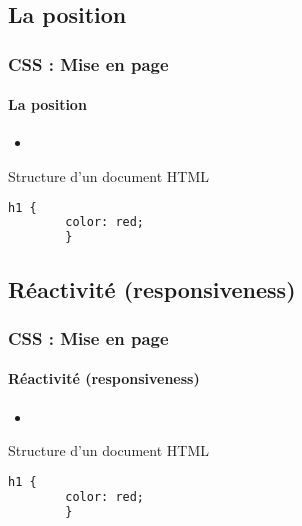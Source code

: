 \documentclass[xcolor=table]{beamer}
\begin{document}
\subsection{La position}

\begin{frame}[fragile]
\frametitle{CSS : Mise en page}
\framesubtitle{La position}

\begin{minipage}{0.60\textwidth}
	\begin{itemize}
		\item 
	\end{itemize}
\end{minipage}
%
\begin{minipage}{0.38\textwidth}
	\begin{block}{Structure d'un document HTML}
		\lstset{escapeinside=**}
		\scriptsize\bfseries
		\begin{lstlisting}[language={html}]
		h1 {
		color: red;
		}
		\end{lstlisting}
	\end{block}
\end{minipage}
\end{frame}


\subsection{Réactivité (responsiveness)}

\begin{frame}[fragile]
\frametitle{CSS : Mise en page}
\framesubtitle{Réactivité (responsiveness)}

\begin{minipage}{0.60\textwidth}
	\begin{itemize}
		\item 
	\end{itemize}
\end{minipage}
%
\begin{minipage}{0.38\textwidth}
	\begin{block}{Structure d'un document HTML}
		\lstset{escapeinside=**}
		\scriptsize\bfseries
		\begin{lstlisting}[language={html}]
		h1 {
		color: red;
		}
		\end{lstlisting}
	\end{block}
\end{minipage}
\end{frame}

\end{document}
